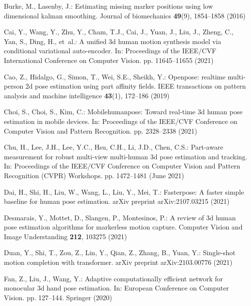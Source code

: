 \documentclass[runningheads]{llncs}
\begin{document}
\clearpage
\begin{thebibliography}{10}
\providecommand{\url}[1]{\texttt{#1}}
\providecommand{\urlprefix}{URL }
\providecommand{\doi}[1]{https://doi.org/#1}

Burke, M., Lasenby, J.: Estimating missing marker positions using low
  dimensional kalman smoothing. Journal of biomechanics  \textbf{49}(9),
  1854--1858 (2016)

Cai, Y., Wang, Y., Zhu, Y., Cham, T.J., Cai, J., Yuan, J., Liu, J., Zheng, C.,
  Yan, S., Ding, H., et~al.: A unified 3d human motion synthesis model via
  conditional variational auto-encoder. In: Proceedings of the IEEE/CVF
  International Conference on Computer Vision. pp. 11645--11655 (2021)

Cao, Z., Hidalgo, G., Simon, T., Wei, S.E., Sheikh, Y.: Openpose: realtime
  multi-person 2d pose estimation using part affinity fields. IEEE transactions
  on pattern analysis and machine intelligence  \textbf{43}(1),  172--186
  (2019)

Choi, S., Choi, S., Kim, C.: Mobilehumanpose: Toward real-time 3d human pose
  estimation in mobile devices. In: Proceedings of the IEEE/CVF Conference on
  Computer Vision and Pattern Recognition. pp. 2328--2338 (2021)

Chu, H., Lee, J.H., Lee, Y.C., Hsu, C.H., Li, J.D., Chen, C.S.: Part-aware
  measurement for robust multi-view multi-human 3d pose estimation and
  tracking. In: Proceedings of the IEEE/CVF Conference on Computer Vision and
  Pattern Recognition (CVPR) Workshops. pp. 1472--1481 (June 2021)

Dai, H., Shi, H., Liu, W., Wang, L., Liu, Y., Mei, T.: Fasterpose: A faster
  simple baseline for human pose estimation. arXiv preprint arXiv:2107.03215
  (2021)

Desmarais, Y., Mottet, D., Slangen, P., Montesinos, P.: A review of 3d human
  pose estimation algorithms for markerless motion capture. Computer Vision and
  Image Understanding  \textbf{212},  103275 (2021)

Duan, Y., Shi, T., Zou, Z., Lin, Y., Qian, Z., Zhang, B., Yuan, Y.: Single-shot
  motion completion with transformer. arXiv preprint arXiv:2103.00776  (2021)

Fan, Z., Liu, J., Wang, Y.: Adaptive computationally efficient network for
  monocular 3d hand pose estimation. In: European Conference on Computer
  Vision. pp. 127--144. Springer (2020)


\end{thebibliography}
\end{document}
